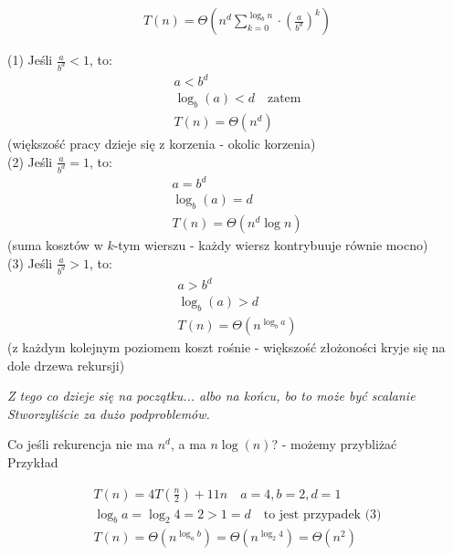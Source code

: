 \documentclass{article}
\numberwithin{equation}{subsection}
\begin{document}
\begin{align}
    T(n) = \Theta\left(n^d \sum_{k=0}^{\log_b n} \cdot \left(\frac{a}{b^d}\right)^k \right)
\end{align}

\noindent
(1) Jeśli $\frac{a}{b^d} < 1$, to:
\begin{align}
    a < b^d \\
    \log_b (a) < d \quad \text{zatem} \\
    T(n) = \Theta(n^d)
\end{align}
(większość pracy dzieje się z korzenia - okolic korzenia)\\

\noindent
(2) Jeśli $\frac{a}{b^d} = 1$, to:
\begin{align}
    a = b^d \\
    \log_b (a) = d \\
    T(n) = \Theta(n^d \log n)
\end{align}
(suma kosztów w $k$-tym wierszu - każdy wiersz kontrybuuje równie mocno)\\

\noindent
(3) Jeśli $\frac{a}{b^d} > 1$, to:
\begin{align}
    a > b^d \\
    \log_b (a) > d \\
    T(n) = \Theta(n^{\log_b a})
\end{align}
(z każdym kolejnym poziomem koszt rośnie - większość złożoności kryje się na dole drzewa rekursji)

\vspace{1cm}

\textit{Z tego co dzieje się na początku... albo na końcu, bo to może być scalanie}\\
\textit{Stworzyliście za dużo podproblemów.}
    
\vspace{1cm}

\noindent
Co jeśli rekurencja nie ma $n^d$, a ma $n\log(n)$? - możemy przybliżać\\

\noindent
Przykład

\begin{align}
    T(n) = 4 T\left(\frac{n}{2}\right) + 11 n \quad a=4, b=2, d=1\\
    \log_b a = \log_2 4 = 2 > 1 = d \quad \text{to jest przypadek (3)}\\
    T(n) = \Theta\left(n^{\log_a b}\right) = \Theta\left(n^{\log_2 4}\right) = \Theta\left(n^2\right)
\end{align}
\end{document}

